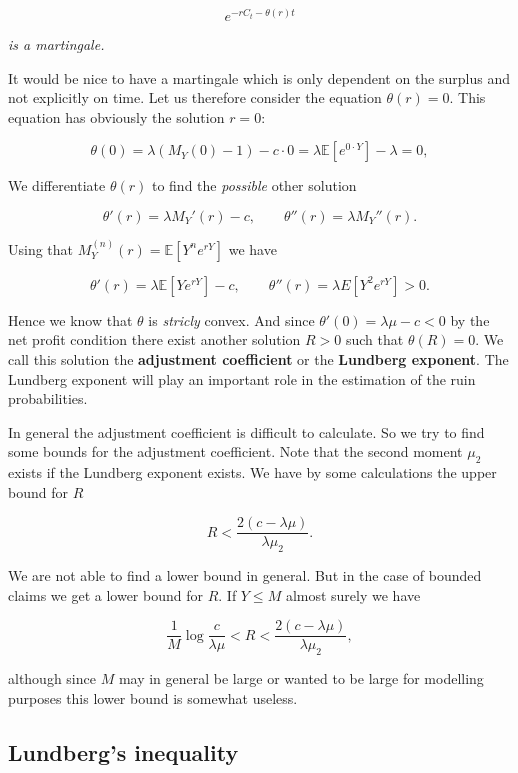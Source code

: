 \documentclass[a4paper,10pt,openany]{book}
\begin{document}
\[
e^{-rC_t-\theta(r)t}
\]

\emph{is a martingale.}

It would be nice to have a martingale which is only dependent on the surplus and not explicitly on time. Let us therefore consider the equation \(\theta(r) = 0\). This equation has obviously the solution \(r = 0\):

\[
\theta(0)=\lambda(M_Y(0)-1)-c\cdot 0=\lambda\mathbb E[e^{0\cdot Y}]-\lambda=0,
\]

We differentiate \(\theta(r)\) to find the \emph{possible} other solution

\[
\theta'(r)=\lambda M_Y'(r)-c,\qquad \theta''(r)=\lambda M_Y''(r).
\]

Using that \(M_Y^{(n)}(r)=\mathbb E[Y^ne^{rY}]\) we have

\[
\theta'(r)=\lambda \mathbb E[Ye^{rY}] - c,\qquad \theta''(r)=\lambda E[Y^2e^{rY}]>0.
\]

Hence we know that \(\theta\) is \emph{stricly} convex. And since \(\theta'(0)=\lambda\mu-c<0\) by the net profit condition there exist another solution \(R>0\) such that \(\theta(R)=0\). We call this solution the \textbf{adjustment coefficient} or the \textbf{Lundberg exponent}. The Lundberg exponent will play an important role in the estimation of the ruin probabilities.

In general the adjustment coefficient is difficult to calculate. So we try to find some bounds for the adjustment coefficient. Note that the second moment \(μ_2\) exists if the Lundberg exponent exists. We have by some calculations the upper bound for \(R\)

\[
R<\frac{2(c-\lambda\mu)}{\lambda \mu_2}.
\]

We are not able to find a lower bound in general. But in the case of bounded claims we get a lower bound for \(R\). If \(Y\le M\) almost surely we have

\[
\frac{1}{M}\log\frac{c}{\lambda \mu}<R<\frac{2(c-\lambda\mu)}{\lambda \mu_2},
\]

although since \(M\) may in general be large or wanted to be large for modelling purposes this lower bound is somewhat useless.

\hypertarget{lundbergs-inequality}{%
\subsection{Lundberg's inequality}\label{lundbergs-inequality}}
\end{document}
